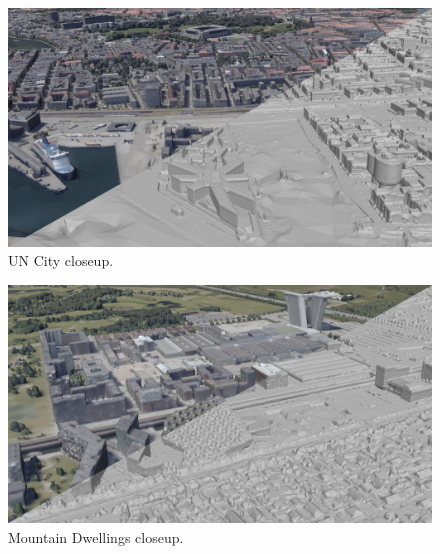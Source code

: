 \documentclass[10pt,letterpaper]{article}
\begin{document}
\begin{figure}
    \centering
    \capstart
    \begin{minipage}[b]{1.0\linewidth}
        \includegraphics[width=\textwidth]{images/copenhagen/results/closeups/diag/un_city_diag.jpg}
    \end{minipage}
    \caption{UN City closeup.}
    \label{fig:closeup_un_city}
\end{figure}

\begin{figure}
    \centering
    \capstart
    \begin{minipage}[b]{1.0\linewidth}
        \includegraphics[width=\textwidth]{images/copenhagen/results/closeups/diag/mountain_dwellings_diag.jpg}
    \end{minipage}
    \caption{Mountain Dwellings closeup.}
    \label{fig:closeup_mountain_dwellings}
\end{figure}

\clearpage
{\small


}
\end{document}
